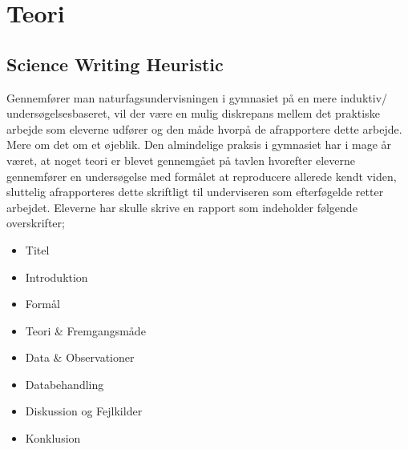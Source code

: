 \section{Teori}
\label{sec:teo}

\subsection*{Science Writing Heuristic}
Gennemfører man naturfagsundervisningen i gymnasiet på en mere induktiv/ undersøgelsesbaseret, vil der være en mulig diskrepans mellem det praktiske arbejde som eleverne udfører og den måde hvorpå de afrapportere dette arbejde. Mere om det om et øjeblik. Den almindelige praksis i gymnasiet har i mage år været, at noget teori er blevet gennemgået på tavlen hvorefter eleverne gennemfører en undersøgelse med formålet at reproducere allerede kendt viden, sluttelig afrapporteres dette skriftligt til underviseren som efterføgelde retter arbejdet. Eleverne har skulle skrive en rapport som indeholder følgende overskrifter;
\begin{itemize}
	\item Titel\vspace{-15pt}
	\item Introduktion\vspace{-15pt}
	\item Formål\vspace{-15pt}
	\item Teori \& Fremgangsmåde\vspace{-15pt}
	\item Data \& Observationer\vspace{-15pt}
	\item Databehandling\vspace{-15pt}
	\item Diskussion og Fejlkilder\vspace{-15pt}
	\item Konklusion
\end{itemize}
